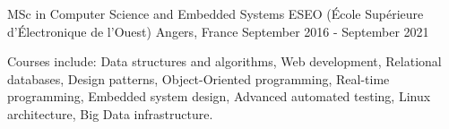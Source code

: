 

\begin{cventries}

  \cventry
    {MSc in Computer Science and Embedded Systems} %
    {ESEO (École Supérieure d'Électronique de l'Ouest)} %
    {Angers, France} %
    {September 2016 - September 2021} %
    {
      \begin{cvitems} %
        \item {Courses include: Data structures and algorithms, Web development, Relational databases, Design patterns, Object-Oriented programming, Real-time programming, Embedded system design, Advanced automated testing, Linux architecture, Big Data infrastructure.}
      \end{cvitems}
    }

\end{cventries}
